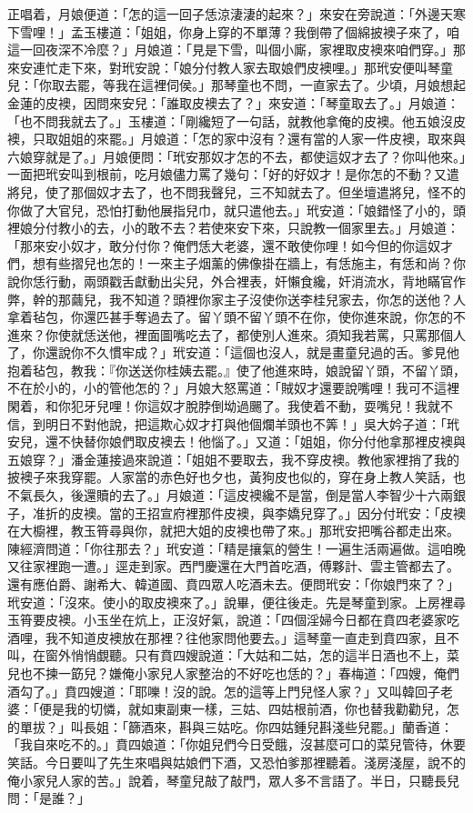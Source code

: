 正唱着，月娘便道：「怎的這一回子恁涼淒淒的起來？」來安在旁說道：「外邊天寒下雪哩！」孟玉樓道：「姐姐，你身上穿的不單薄？我倒帶了個綿披襖子來了，咱這一回夜深不冷麼？」月娘道：「見是下雪，叫個小廝，家裡取皮襖來咱們穿。」那來安連忙走下來，對玳安說：「娘分付教人家去取娘們皮襖哩。」那玳安便叫琴童兒：「你取去罷，等我在這裡伺侯。」那琴童也不問，一直家去了。少頃，月娘想起金蓮的皮襖，因問來安兒：「誰取皮襖去了？」來安道：「琴童取去了。」月娘道：「也不問我就去了。」玉樓道：「剛纔短了一句話，就教他拿俺的皮襖。他五娘沒皮襖，只取姐姐的來罷。」月娘道：「怎的家中沒有？還有當的人家一件皮襖，取來與六娘穿就是了。」月娘便問：「玳安那奴才怎的不去，都使這奴才去了？你叫他來。」一面把玳安叫到根前，吃月娘儘力罵了幾句：「好的好奴才！是你怎的不動？又遣將兒，使了那個奴才去了，也不問我聲兒，三不知就去了。但坐壇遣將兒，怪不的你做了大官兒，恐怕打動他展指兒巾，就只遣他去。」玳安道：「娘錯怪了小的，頭裡娘分付教小的去，小的敢不去？若使來安下來，只說教一個家里去。」月娘道：「那來安小奴才，敢分付你？俺們恁大老婆，還不敢使你哩！如今但的你這奴才們，想有些摺兒也怎的！一來主子烟薰的佛像掛在牆上，有恁施主，有恁和尚？你說你恁行動，兩頭戳舌獻動出尖兒，外合裡表，奸懶食纔，奸消流水，背地瞞官作弊，幹的那繭兒，我不知道？頭裡你家主子沒使你送李桂兒家去，你怎的送他？人拿着毡包，你還匹甚手奪過去了。留丫頭不留丫頭不在你，使你進來說，你怎的不進來？你使就恁送他，裡面圖嘴吃去了，都使別人進來。須知我若罵，只罵那個人了，你還說你不久慣牢成？」玳安道：「這個也沒人，就是畫童兒過的舌。爹見他抱着毡包，教我：『你送送你桂姨去罷。』使了他進來時，娘說留丫頭，不留丫頭，不在於小的，小的管他怎的？」月娘大怒罵道：「賊奴才還要說嘴哩！我可不這裡閑着，和你犯牙兒哩！你這奴才脫脖倒坳過颺了。我使着不動，耍嘴兒！我就不信，到明日不對他說，把這欺心奴才打與他個爛羊頭也不筭！」吳大妗子道：「玳安兒，還不快替你娘們取皮襖去！他惱了。」又道：「姐姐，你分付他拿那裡皮襖與五娘穿？」潘金蓮接過來說道：「姐姐不要取去，我不穿皮襖。教他家裡捎了我的披襖子來我穿罷。人家當的赤色好也夕也，黃狗皮也似的，穿在身上教人笑話，也不氣長久，後還贖的去了。」月娘道：「這皮襖纔不是當，倒是當人李智少十六兩銀子，准折的皮襖。當的王招宣府裡那件皮襖，與李嬌兒穿了。」因分付玳安：「皮襖在大櫥裡，教玉筲尋與你，就把大姐的皮襖也帶了來。」那玳安把嘴谷都走出來。陳經濟問道：「你往那去？」玳安道：「精是攘氣的營生！一遍生活兩遍做。這咱晚又往家裡跑一遭。」逕走到家。西門慶還在大門首吃酒，傅夥計、雲主管都去了。還有應伯爵、謝希大、韓道國、賁四眾人吃酒未去。便問玳安：「你娘門來了？」玳安道：「沒來。使小的取皮襖來了。」說畢，便往後走。先是琴童到家。上房裡尋玉筲要皮襖。小玉坐在炕上，正沒好氣，說道：「四個淫婦今日都在賁四老婆家吃酒哩，我不知道皮襖放在那裡？往他家問他要去。」這琴童一直走到賁四家，且不叫，在窗外悄悄覷聽。只有賁四嫂說道：「大姑和二姑，怎的這半日酒也不上，菜兒也不揀一筯兒？嫌俺小家兒人家整治的不好吃也恁的？」春梅道：「四嫂，俺們酒勾了。」賁四嫂道：「耶嚛！沒的說。怎的這等上門兒怪人家？」又叫韓回子老婆：「便是我的切憐，就如東副東一樣，三姑、四姑根前酒，你也替我勸勸兒，怎的單拔？」叫長姐：「篩酒來，斟與三姑吃。你四姑鍾兒斟淺些兒罷。」蘭香道：「我自來吃不的。」賁四娘道：「你姐兒們今日受餓，沒甚麼可口的菜兒管待，休要笑話。今日要叫了先生來唱與姑娘們下酒，又恐怕爹那裡聽着。淺房淺屋，說不的俺小家兒人家的苦。」說着，琴童兒敲了敲門，眾人多不言語了。半日，只聽長兒問：「是誰？」
